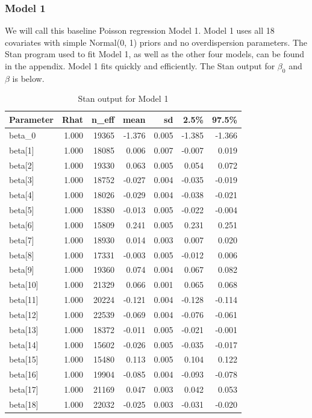 \documentclass[]{article}
\begin{document}
\subsubsection{Model 1}\label{model-1}

We will call this baseline Poisson regression Model 1. Model 1 uses all
18 covariates with simple Normal(0, 1) priors and no overdispersion
parameters. The Stan program used to fit Model 1, as well as the other
four models, can be found in the appendix. Model 1 fits quickly and
efficiently. The Stan output for \(\beta_0\) and \(\beta\) is below.

\begin{table}[ht]
\centering
\begin{tabular}{lrrrrrr}
  \toprule
Parameter & Rhat & n\_eff & mean & sd & 2.5\% & 97.5\% \\ 
  \midrule
beta\_0 & 1.000 & 19365 & -1.376 & 0.005 & -1.385 & -1.366 \\ 
  beta[1] & 1.000 & 18085 & 0.006 & 0.007 & -0.007 & 0.019 \\ 
  beta[2] & 1.000 & 19330 & 0.063 & 0.005 & 0.054 & 0.072 \\ 
  beta[3] & 1.000 & 18752 & -0.027 & 0.004 & -0.035 & -0.019 \\ 
  beta[4] & 1.000 & 18026 & -0.029 & 0.004 & -0.038 & -0.021 \\ 
  beta[5] & 1.000 & 18380 & -0.013 & 0.005 & -0.022 & -0.004 \\ 
  beta[6] & 1.000 & 15809 & 0.241 & 0.005 & 0.231 & 0.251 \\ 
  beta[7] & 1.000 & 18930 & 0.014 & 0.003 & 0.007 & 0.020 \\ 
  beta[8] & 1.000 & 17331 & -0.003 & 0.005 & -0.012 & 0.006 \\ 
  beta[9] & 1.000 & 19360 & 0.074 & 0.004 & 0.067 & 0.082 \\ 
  beta[10] & 1.000 & 21329 & 0.066 & 0.001 & 0.065 & 0.068 \\ 
  beta[11] & 1.000 & 20224 & -0.121 & 0.004 & -0.128 & -0.114 \\ 
  beta[12] & 1.000 & 22539 & -0.069 & 0.004 & -0.076 & -0.061 \\ 
  beta[13] & 1.000 & 18372 & -0.011 & 0.005 & -0.021 & -0.001 \\ 
  beta[14] & 1.000 & 15602 & -0.026 & 0.005 & -0.035 & -0.017 \\ 
  beta[15] & 1.000 & 15480 & 0.113 & 0.005 & 0.104 & 0.122 \\ 
  beta[16] & 1.000 & 19904 & -0.085 & 0.004 & -0.093 & -0.078 \\ 
  beta[17] & 1.000 & 21169 & 0.047 & 0.003 & 0.042 & 0.053 \\ 
  beta[18] & 1.000 & 22032 & -0.025 & 0.003 & -0.031 & -0.020 \\ 
   \bottomrule
\end{tabular}
\caption{Stan output for Model 1} 
\end{table}
\end{document}
